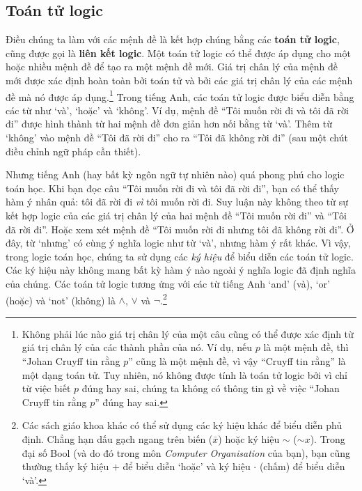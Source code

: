 \subsection{Toán tử logic}

Điều chúng ta làm với các mệnh đề là kết hợp chúng bằng các \textbf{toán tử logic}, cũng được gọi là \textbf{liên kết logic}. Một toán tử logic có thể được áp dụng cho một hoặc nhiều mệnh đề để tạo ra một mệnh đề mới. Giá trị chân lý của mệnh đề mới được xác định hoàn toàn bởi toán tử và bởi các giá trị chân lý của các mệnh đề mà nó được áp dụng.\footnote{Không phải lúc nào giá trị chân lý của một câu cũng có thể được xác định từ giá trị chân lý của các thành phần của nó. Ví dụ, nếu $p$ là một mệnh đề, thì ``Johan Cruyff tin rằng $p$'' cũng là một mệnh đề, vì vậy ``Cruyff tin rằng'' là một dạng toán tử. Tuy nhiên, nó không được tính là toán tử logic bởi vì chỉ từ việc biết $p$ đúng hay sai, chúng ta không có thông tin gì về việc ``Johan Cruyff tin rằng $p$'' đúng hay sai.} Trong tiếng Anh, các toán tử logic được biểu diễn bằng các từ như `và', `hoặc' và `không'. Ví dụ, mệnh đề ``Tôi muốn rời đi và tôi đã rời đi'' được hình thành từ hai mệnh đề đơn giản hơn nối bằng từ `và'. Thêm từ `không' vào mệnh đề ``Tôi đã rời đi'' cho ra ``Tôi đã không rời đi'' (sau một chút điều chỉnh ngữ pháp cần thiết).

Nhưng tiếng Anh (hay bất kỳ ngôn ngữ tự nhiên nào) quá phong phú cho logic toán học. Khi bạn đọc câu ``Tôi muốn rời đi và tôi đã rời đi'', bạn có thể thấy hàm ý nhân quả: tôi đã rời đi \emph{vì} tôi muốn rời đi. Suy luận này không theo từ sự kết hợp logic của các giá trị chân lý của hai mệnh đề ``Tôi muốn rời đi'' và ``Tôi đã rời đi''. Hoặc xem xét mệnh đề ``Tôi muốn rời đi nhưng tôi đã không rời đi''. Ở đây, từ `nhưng' có cùng ý nghĩa logic như từ `và', nhưng hàm ý rất khác. Vì vậy, trong logic toán học, chúng ta sử dụng các \emph{ký hiệu} để biểu diễn các toán tử logic. Các ký hiệu này không mang bất kỳ hàm ý nào ngoài ý nghĩa logic đã định nghĩa của chúng. Các toán tử logic tương ứng với các từ tiếng Anh `and' (và), `or' (hoặc) và `not' (không) là $\land$, $\lor$ và $\lnot$.\footnote{Các sách giáo khoa khác có thể sử dụng các ký hiệu khác để biểu diễn phủ định. Chẳng hạn dấu gạch ngang trên biến ($\bar{x}$) hoặc ký hiệu $\sim$ ($\sim x$). Trong đại số Bool (và do đó trong môn \emph{Computer Organisation} của bạn), bạn cũng thường thấy ký hiệu $+$ để biểu diễn `hoặc' và ký hiệu $\cdot$ (chấm) để biểu diễn `và'.}

